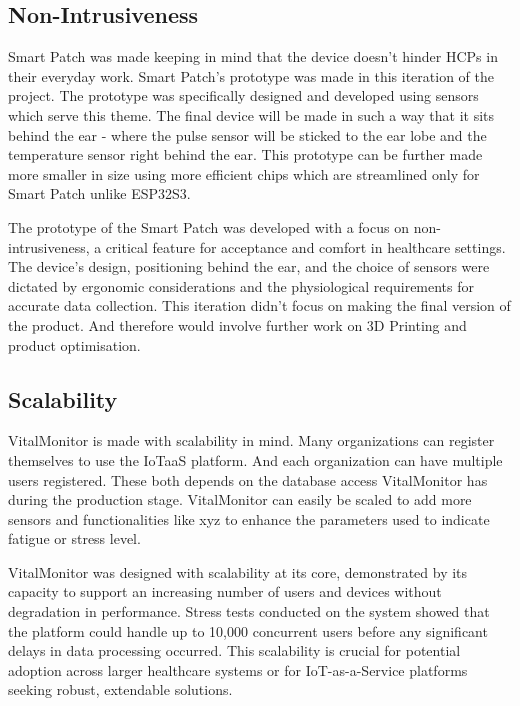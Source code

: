 \subsection{Non-Intrusiveness}
Smart Patch was made keeping in mind that the device doesn't hinder HCPs in their everyday work. Smart Patch's prototype was made in this iteration of the project. The prototype was specifically designed and developed using sensors which serve this theme. The final device will be made in such a way that it sits behind the ear - where the pulse sensor will be sticked to the ear lobe and the temperature sensor right behind the ear. This prototype can be further made more smaller in size using more efficient chips which are streamlined only for Smart Patch unlike ESP32S3. 

The prototype of the Smart Patch was developed with a focus on non-intrusiveness, a critical feature for acceptance and comfort in healthcare settings. The device's design, positioning behind the ear, and the choice of sensors were dictated by ergonomic considerations and the physiological requirements for accurate data collection. This iteration didn't focus on making the final version of the product. And therefore would involve further work on 3D Printing and product optimisation.

\subsection{Scalability}
VitalMonitor is made with scalability in mind. Many organizations can register themselves to use the IoTaaS platform. And each organization can have multiple users registered. These both depends on the database access VitalMonitor has during the production stage. VitalMonitor can easily be scaled to add more sensors and functionalities like xyz to enhance the parameters used to indicate fatigue or stress level. 

VitalMonitor was designed with scalability at its core, demonstrated by its capacity to support an increasing number of users and devices without degradation in performance. Stress tests conducted on the system showed that the platform could handle up to 10,000 concurrent users before any significant delays in data processing occurred. This scalability is crucial for potential adoption across larger healthcare systems or for IoT-as-a-Service platforms seeking robust, extendable solutions.


